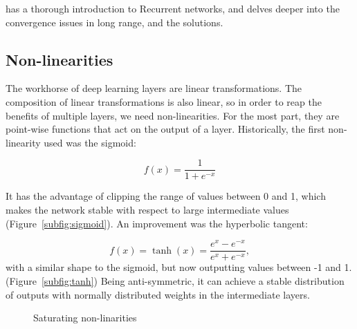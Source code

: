 \citet{unreasonable_RNN} has a thorough introduction to Recurrent networks, and \citet{colah_rnn} delves deeper into the convergence issues in long range, and the solutions.

\subsection{Non-linearities}
The workhorse of deep learning layers are linear transformations.
The composition of linear transformations is also linear, so in order to reap the benefits of multiple layers, we need non-linearities.
For the most part, they are point-wise functions that act on the output of a layer.
Historically, the first non-linearity used was the sigmoid:

\begin{equation*}
f(x) = \frac{1}{1 + e^{- x}}
\end{equation*}

It has the advantage of clipping the range of values between 0 and 1, which makes the network stable with respect to large intermediate values (Figure~\ref{subfig:sigmoid}).
An improvement was the hyperbolic tangent:

\begin{equation*}
f(x) = \tanh(x) = \frac{e^x - e^{-x}}{e^x + e^{-x}},
\end{equation*}
with a similar shape to the sigmoid, but now outputting values between -1 and 1. (Figure~\ref{subfig:tanh})
Being anti-symmetric, it can achieve a stable distribution of outputs with normally distributed weights in the intermediate layers.

\begin{figure}[tb]
	\hfil
	\caption{Saturating non-linarities}\label{fig:non_linear}
\end{figure}

